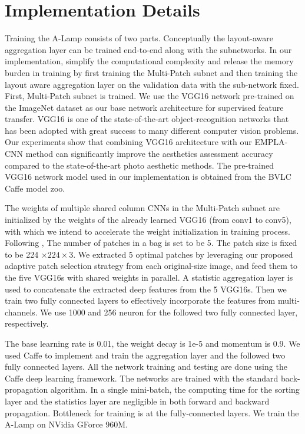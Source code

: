 \documentclass[10pt,twocolumn,letterpaper]{article}
\begin{document}
\section{Implementation Details}
Training the A-Lamp consists of two parts. Conceptually the layout-aware aggregation layer can be trained end-to-end along with the subnetworks. In our implementation, simplify the computational complexity and release the memory burden in training by first training the Multi-Patch subnet and then training the layout aware aggregation layer on the validation data with the sub-network fixed.
First, Multi-Patch subnet is trained. 
We use the VGG16 network pre-trained on the ImageNet dataset as our base network architecture for supervised feature transfer. VGG16 is one of the state-of-the-art object-recognition networks that has been adopted with great success to many different computer vision problems. Our experiments show that combining VGG16 architecture with our EMPLA-CNN method can significantly improve the aesthetics assessment accuracy compared to the state-of-the-art photo aesthetic methods. The pre-trained VGG16 network model used in our implementation is obtained from the BVLC Caffe model zoo.
 
The weights of multiple shared column CNNs in the Multi-Patch subnet are initialized by the weights of the already learned VGG16 (from conv1 to conv5), with which we intend to accelerate the weight initialization in training process. Following \cite{Lu:2015:ICCV}, The number of patches in a bag is set to be 5. The patch size is fixed to be 224 $ \times 224 \times 3$. We extracted 5 optimal patches by leveraging our proposed adaptive patch selection strategy from each original-size image, and feed them to the five VGG16s with shared weights in parallel. A statistic aggregation layer is used to concatenate the extracted deep features from the 5 VGG16s. Then we train two fully connected layers to effectively incorporate the features from multi-channels. We use 1000 and 256 neuron for the followed two fully connected layer, respectively. 

The base learning rate is 0.01, the weight decay is 1e-5 and momentum is 0.9.  
We used Caffe to implement and train the aggregation layer and the followed two fully connected layers.
All the network training and testing are done using the Caffe deep learning framework. The networks are trained with the standard back-propagation algorithm. In a single mini-batch, the computing time for the sorting
layer and the statistics layer are negligible in both forward
and backward propagation. Bottleneck for training is at the
fully-connected layers. We train the A-Lamp on NVidia GForce 960M.
\end{document}
